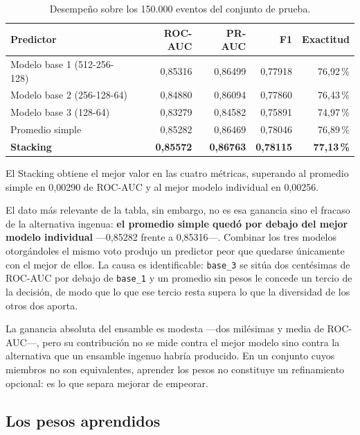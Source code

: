 \documentclass[12pt,a4paper]{article}
\begin{document}
\begin{table}[H]
\centering
\caption{Desempeño sobre los 150.000 eventos del conjunto de prueba.}
\label{tab:test}
\begin{tabular}{lrrrr}
\toprule
\textbf{Predictor} & \textbf{ROC-AUC} & \textbf{PR-AUC} & \textbf{F1} & \textbf{Exactitud} \\
\midrule
Modelo base 1 (512-256-128) & 0,85316 & 0,86499 & 0,77918 & 76,92\,\% \\
Modelo base 2 (256-128-64)  & 0,84880 & 0,86094 & 0,77860 & 76,43\,\% \\
Modelo base 3 (128-64)      & 0,83279 & 0,84582 & 0,75891 & 74,97\,\% \\
Promedio simple             & 0,85282 & 0,86469 & 0,78046 & 76,89\,\% \\
\textbf{Stacking}           & \textbf{0,85572} & \textbf{0,86763} & \textbf{0,78115} & \textbf{77,13\,\%} \\
\bottomrule
\end{tabular}
\end{table}

El Stacking obtiene el mejor valor en las cuatro métricas, superando al promedio simple en 0,00290
de ROC-AUC y al mejor modelo individual en 0,00256.

El dato más relevante de la tabla, sin embargo, no es esa ganancia sino el fracaso de la
alternativa ingenua: \textbf{el promedio simple quedó por debajo del mejor modelo individual}
---0,85282 frente a 0,85316---. Combinar los tres modelos otorgándoles el mismo voto produjo un
predictor peor que quedarse únicamente con el mejor de ellos. La causa es identificable:
\texttt{base\_3} se sitúa dos centésimas de ROC-AUC por debajo de \texttt{base\_1} y un promedio
sin pesos le concede un tercio de la decisión, de modo que lo que ese tercio resta supera lo que
la diversidad de los otros dos aporta.

La ganancia absoluta del ensamble es modesta ---dos milésimas y media de ROC-AUC---, pero su
contribución no se mide contra el mejor modelo sino contra la alternativa que un ensamble ingenuo
habría producido. En un conjunto cuyos miembros no son equivalentes, aprender los pesos no
constituye un refinamiento opcional: es lo que separa mejorar de empeorar.

\subsection{Los pesos aprendidos}
\end{document}
